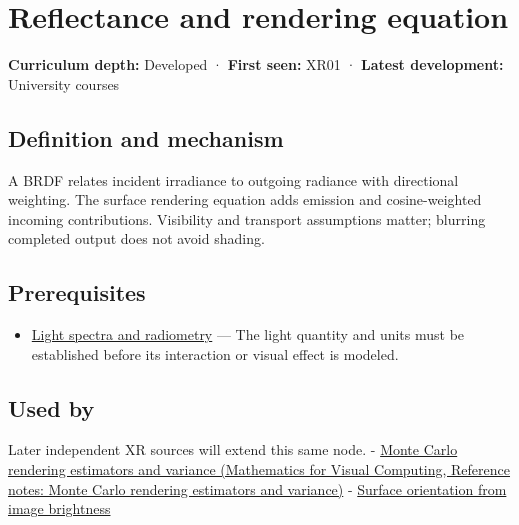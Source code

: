 \hypertarget{appendix-96da0b153b77}{}\label{referencestart:appendix-96da0b153b77}
\section{Reflectance and rendering equation}\label{appendix-96da0b153b77-reflectance-and-rendering-equation}

\textbf{Curriculum depth:} Developed · \textbf{First seen:} XR01 · \textbf{Latest development:} University courses

\begin{allmightroledefinition}

\subsection{Definition and mechanism}\label{appendix-96da0b153b77-definition-and-mechanism}

A BRDF relates incident irradiance to outgoing radiance with directional weighting. The surface rendering equation adds emission and cosine-weighted incoming contributions. Visibility and transport assumptions matter; blurring completed output does not avoid shading.

\end{allmightroledefinition}

\subsection{Prerequisites}\label{appendix-96da0b153b77-prerequisites}

\begin{itemize}
\tightlist
\item
  \hyperref[appendix-215c2570199b]{Light spectra and radiometry} --- The light quantity and units must be established before its interaction or visual effect is modeled.
\end{itemize}

\subsection{Used by}\label{appendix-96da0b153b77-used-by}

Later independent XR sources will extend this same node. - \href{../02-Mathematics-for-Visual-Computing/main.pdf\#nameddest=appendix-031e02bf28af}{Monte Carlo rendering estimators and variance (Mathematics for Visual Computing, Reference notes: Monte Carlo rendering estimators and variance)} - \hyperref[appendix-89b2d5b7c9e1]{Surface orientation from image brightness}

